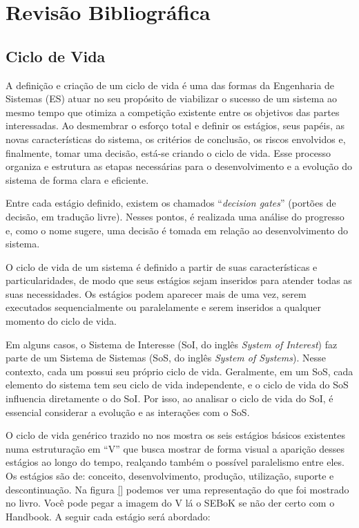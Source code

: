 
\chapter{Revisão Bibliográfica}\label{chap:revisao}

\section{Ciclo de Vida}\label{sec:revisao:ciclodevida}

	A definição e criação de um ciclo de vida é uma das formas da Engenharia de Sistemas (ES) atuar no seu propósito de viabilizar o sucesso de um sistema ao
	mesmo tempo que otimiza a competição existente entre os objetivos das partes interessadas. Ao desmembrar o esforço total e definir os estágios, seus papéis, as novas características do sistema, os critérios de conclusão, os riscos envolvidos e, finalmente, tomar uma decisão, está-se criando o ciclo de vida. Esse processo organiza e estrutura as etapas necessárias para o desenvolvimento e a evolução do sistema de forma clara e eficiente.

	Entre cada estágio definido, existem os chamados ``\textit{decision gates}'' (portões de decisão, em tradução livre). Nesses pontos, é realizada uma análise do progresso e, como o nome sugere, uma decisão é tomada em relação ao desenvolvimento do sistema.

	O ciclo de vida de um sistema é definido a partir de suas características e particularidades, de modo que seus estágios sejam inseridos para atender todas as suas
	necessidades. Os estágios podem aparecer mais de uma vez, serem executados sequencialmente ou paralelamente e serem inseridos a qualquer momento do ciclo de vida.

	Em alguns casos, o Sistema de Interesse (SoI, do inglês \textit{System of Interest}) faz parte de um Sistema de Sistemas (SoS, do inglês \textit{System of Systems}). Nesse contexto, cada um possui seu próprio ciclo de vida. Geralmente, em um SoS, cada elemento do sistema tem seu ciclo de vida independente, e o ciclo de vida do SoS influencia diretamente o do SoI. Por isso, ao analisar o ciclo de vida do SoI, é essencial considerar a evolução e as interações com o SoS.

	O ciclo de vida genérico trazido no \cite{incoseHandbook} nos mostra os seis estágios básicos existentes numa estruturação em ``V'' que busca mostrar de forma visual a aparição desses estágios
	ao longo do tempo, realçando também o possível paralelismo entre eles. Os estágios são de: conceito, desenvolvimento, produção, utilização, suporte e descontinuação. Na figura \ref{} podemos ver uma representação do que foi mostrado no livro. {\color{red} Você pode pegar a imagem do V lá o SEBoK se não der certo com o Handbook.} A seguir cada estágio será abordado:

